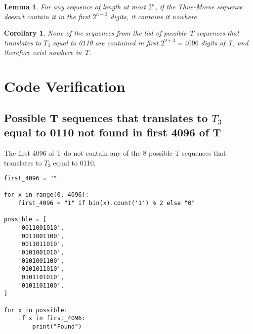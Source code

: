 \documentclass[12pt]{article}
\newtheorem{corollary}{Corollary}[theorem]
\newtheorem{lemma}[theorem]{Lemma}
\begin{document}
\begin{lemma} For any sequence of length at most $2^n$, if the Thue-Morse sequence doesn't contain it in the first $2^{n+3}$ digits, it contains it nowhere.
\end{lemma}

\begin{corollary}
	None of the sequences from the list of possible T sequences that translates to $T_3$ equal to 0110 are contained in first $2 ^ {9 + 3} = 4096$ digits of T, and therefore exist nowhere in T.
\end{corollary}


\section{Code Verification}

\subsection{Possible T sequences that translates to $T_3$ equal to 0110 not found in first 4096 of T}
The first 4096 of T do not contain any of the 8 possible T sequences that translates to $T_3$ equal to 0110.\\

\begin{lstlisting}[caption={Possible T sequences that translates to $T_3$ equal to 0110 not found in first 4096 of T}]
first_4096 = ""

for x in range(0, 4096):
    first_4096 = "1" if bin(x).count('1') % 2 else "0"

possible = [
    '0011001010',
    '0011001100',
    '0011011010',
    '0101001010',
    '0101001100',
    '0101011010',
    '0101101010',
    '0101101100',
]

for x in possible:
    if x in first_4096:
        print("Found")
\end{lstlisting}
\end{document}
